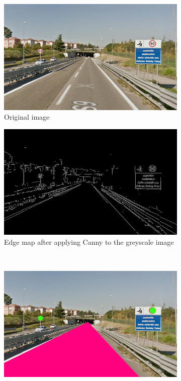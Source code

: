 \documentclass[twoside,onecolumn]{article}
\theoremstyle{definition}
\begin{document}
  
\begin{figure} \centering
\begin{subfigure}{0.45\textwidth}
  \includegraphics[width=\textwidth]{figs/road3.jpg}
\caption{ Original image}\label{fig:r3fig}
\end{subfigure} \quad
\begin{subfigure}{0.45\textwidth}
\includegraphics[width=\textwidth]{figs/edgeMap_road3.png}
\caption{Edge map after applying Canny to the greyscale image}\label{fig:r3edges}
\end{subfigure}\\
  \begin{subfigure}{0.6\textwidth}
\includegraphics[width=\textwidth]{figs/Circles_road3.png}

\end{subfigure}
\end{figure}
\end{document}
